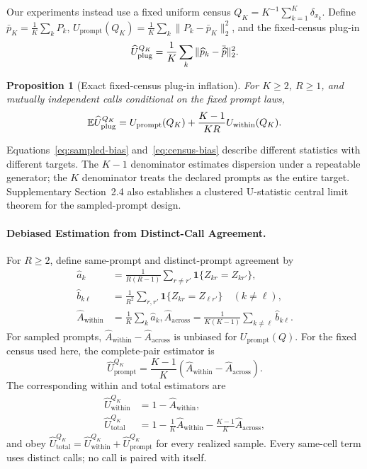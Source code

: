 \documentclass[letterpaper]{article}
\newtheorem{proposition}{Proposition}
\newcommand{\E}{\mathbb E}
\newcommand{\1}{\mathbf 1}
\newcommand{\Up}{U_{\mathrm{prompt}}}
\newcommand{\Uw}{U_{\mathrm{within}}}
\newcommand{\Ut}{U_{\mathrm{total}}}
\newcommand{\Aw}{\widehat A_{\mathrm{within}}}
\newcommand{\Aa}{\widehat A_{\mathrm{across}}}
\begin{document}
Our experiments instead use a fixed uniform census
$Q_K=K^{-1}\sum_{k=1}^K\delta_{x_k}$. Define
$\bar p_K=\frac1K\sum_kP_k$,
$\Up(Q_K)=\frac1K\sum_k\|P_k-\bar p_K\|_2^2$,
and the fixed-census plug-in
\[
\widehat U_{\rm plug}^{Q_K}
=\frac1K\sum_k\|\widehat p_k-\bar{\widehat p}\|_2^2.
\]

\begin{proposition}[Exact fixed-census plug-in inflation]
\label{prop:census-bias}
For $K\ge2$, $R\ge1$, and mutually independent calls conditional on the
fixed prompt laws,
\begin{equation}
\E\widehat U_{\rm plug}^{Q_K}
=\Up(Q_K)+\frac{K-1}{KR}\Uw(Q_K).
\label{eq:census-bias}
\end{equation}
\end{proposition}

Equations~\eqref{eq:sampled-bias} and~\eqref{eq:census-bias} describe different statistics with different targets. The $K-1$ denominator estimates dispersion under a
repeatable generator; the $K$ denominator treats the declared prompts as the
entire target. Supplementary Section~2.4 also establishes a clustered U-statistic central limit theorem for the sampled-prompt design.

\paragraph{Debiased Estimation from Distinct-Call Agreement.}

For $R\ge2$, define same-prompt and distinct-prompt agreement by
\begin{align}
\widehat a_k
&=\frac{1}{R(R-1)}\sum_{r\ne r'}
\1\{Z_{kr}=Z_{kr'}\},\\
\widehat b_{k\ell}
&=\frac{1}{R^2}\sum_{r,r'}
\1\{Z_{kr}=Z_{\ell r'}\}\quad(k\ne\ell),\\
\Aw&=\frac1K\sum_k\widehat a_k,
\Aa=\frac{1}{K(K-1)}\sum_{k\ne\ell}\widehat b_{k\ell}.
\end{align}
For sampled prompts, $\Aw-\Aa$ is unbiased for $\Up(Q)$. For the fixed
census used here, the complete-pair estimator is
\begin{equation}
\widehat\Up^{Q_K}
=\frac{K-1}{K}(\Aw-\Aa).
\label{eq:fixed-census-estimator}
\end{equation}
The corresponding within and total estimators are
\begin{align}
\widehat\Uw^{Q_K}&=1-\Aw,\\
\widehat\Ut^{Q_K}
&=1-\frac1K\Aw-\frac{K-1}{K}\Aa,
\end{align}
and obey
$\widehat\Ut^{Q_K}=\widehat\Uw^{Q_K}+\widehat\Up^{Q_K}$ for every realized
sample. Every same-cell term uses distinct calls; no call is paired with itself.
\end{document}
